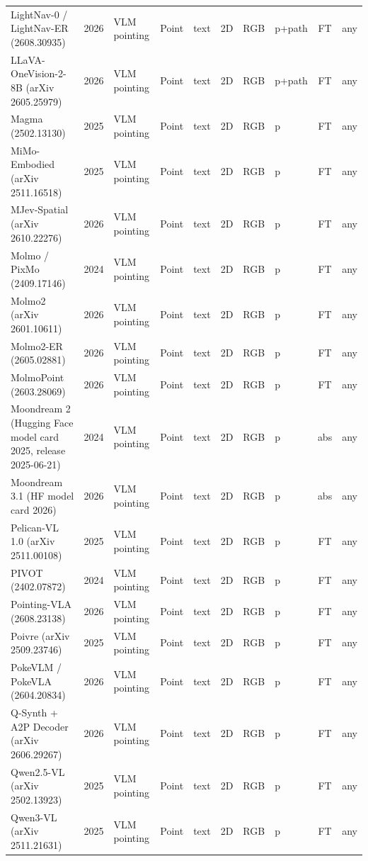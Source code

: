 {\begin{landscape}
\begin{longtable}{@{}p{4.6cm}rp{2.0cm}lllllcl@{}}
LightNav-0 / LightNav-ER (2608.30935) & 2026 & VLM pointing & Point & text & 2D & RGB & p+path & FT & any \\
LLaVA-OneVision-2-8B (arXiv 2605.25979) & 2026 & VLM pointing & Point & text & 2D & RGB & p+path & FT & any \\
Magma (2502.13130) & 2025 & VLM pointing & Point & text & 2D & RGB & p & FT & any \\
MiMo-Embodied (arXiv 2511.16518) & 2025 & VLM pointing & Point & text & 2D & RGB & p & FT & any \\
MJev-Spatial (arXiv 2610.22276) & 2026 & VLM pointing & Point & text & 2D & RGB & p & FT & any \\
Molmo / PixMo (2409.17146) & 2024 & VLM pointing & Point & text & 2D & RGB & p & FT & any \\
Molmo2 (arXiv 2601.10611) & 2026 & VLM pointing & Point & text & 2D & RGB & p & FT & any \\
Molmo2-ER (2605.02881) & 2026 & VLM pointing & Point & text & 2D & RGB & p & FT & any \\
MolmoPoint (2603.28069) & 2026 & VLM pointing & Point & text & 2D & RGB & p & FT & any \\
Moondream 2 (Hugging Face model card 2025, release 2025-06-21) & 2024 & VLM pointing & Point & text & 2D & RGB & p & abs & any \\
Moondream 3.1 (HF model card 2026) & 2026 & VLM pointing & Point & text & 2D & RGB & p & abs & any \\
Pelican-VL 1.0 (arXiv 2511.00108) & 2025 & VLM pointing & Point & text & 2D & RGB & p & FT & any \\
PIVOT (2402.07872) & 2024 & VLM pointing & Point & text & 2D & RGB & p & FT & any \\
Pointing-VLA (2608.23138) & 2026 & VLM pointing & Point & text & 2D & RGB & p & FT & any \\
Poivre (arXiv 2509.23746) & 2025 & VLM pointing & Point & text & 2D & RGB & p & FT & any \\
PokeVLM / PokeVLA (2604.20834) & 2026 & VLM pointing & Point & text & 2D & RGB & p & FT & any \\
Q-Synth + A2P Decoder (arXiv 2606.29267) & 2026 & VLM pointing & Point & text & 2D & RGB & p & FT & any \\
Qwen2.5-VL (arXiv 2502.13923) & 2025 & VLM pointing & Point & text & 2D & RGB & p & FT & any \\
Qwen3-VL (arXiv 2511.21631) & 2025 & VLM pointing & Point & text & 2D & RGB & p & FT & any \\

\end{longtable}
\end{landscape}}
